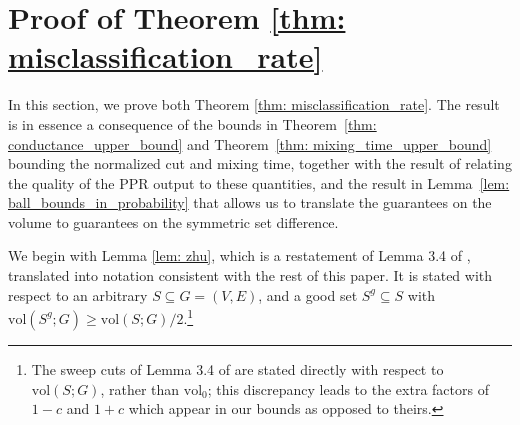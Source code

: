 \documentclass[11pt,twoside]{article}
\newcommand{\vol}{\mathrm{vol}}
\newcommand{\1}{\mathbf{1}}
\begin{document}
\section{Proof of Theorem \ref{thm: misclassification_rate}}
\label{sec: proof_of_misclassification_rate}
In this section, we prove both Theorem \ref{thm: misclassification_rate}.
The result is in essence a consequence of the bounds in Theorem~\ref{thm: conductance_upper_bound} 
and Theorem~\ref{thm: mixing_time_upper_bound} bounding the normalized cut and mixing time, together with the result of \citet{zhu2013} relating the quality of the PPR output to these quantities, and the result in Lemma~\ref{lem: ball_bounds_in_probability}
that allows us to translate the guarantees on the volume to guarantees on the symmetric set difference. 


We begin with Lemma \ref{lem: zhu}, which is a restatement of Lemma 3.4 of \citet{zhu2013}, translated into notation consistent with the rest of this paper. It is stated with respect to an arbitrary $S \subseteq G = (V,E)$, and a good set $S^g \subseteq S$ with $\vol(S^g; G) \geq \vol(S; G)/2$.\footnote{The sweep cuts of Lemma 3.4 of \cite{zhu2013} are stated directly with respect to $\vol(S;G)$, rather than $\vol_0$; this discrepancy leads to the extra factors of $1 - c$ and $1 + c$ which appear in our bounds as opposed to theirs.}
\end{document}
